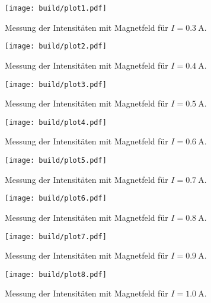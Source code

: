 \begin{figure}
  \centering
  \texttt{[image: build/plot1.pdf]}
  \caption{Messung der Intensitäten mit Magnetfeld für $I=\SI{0.3}{\ampere}$.}
  \label{fig:plot1}
\end{figure}

\begin{figure}
  \centering
  \texttt{[image: build/plot2.pdf]}
  \caption{Messung der Intensitäten mit Magnetfeld für $I=\SI{0.4}{\ampere}$.}
  \label{fig:plot2}
\end{figure}

\begin{figure}
  \centering
  \texttt{[image: build/plot3.pdf]}
  \caption{Messung der Intensitäten mit Magnetfeld für $I=\SI{0.5}{\ampere}$.}
  \label{fig:plot3}
\end{figure}

\begin{figure}
  \centering
  \texttt{[image: build/plot4.pdf]}
  \caption{Messung der Intensitäten mit Magnetfeld für $I=\SI{0.6}{\ampere}$.}
  \label{fig:plot4}
\end{figure}

\begin{figure}
  \centering
  \texttt{[image: build/plot5.pdf]}
  \caption{Messung der Intensitäten mit Magnetfeld für $I=\SI{0.7}{\ampere}$.}
  \label{fig:plot5}
\end{figure}

\begin{figure}
  \centering
  \texttt{[image: build/plot6.pdf]}
  \caption{Messung der Intensitäten mit Magnetfeld für $I=\SI{0.8}{\ampere}$.}
  \label{fig:plot6}
\end{figure}

\begin{figure}
  \centering
  \texttt{[image: build/plot7.pdf]}
  \caption{Messung der Intensitäten mit Magnetfeld für $I=\SI{0.9}{\ampere}$.}
  \label{fig:plot7}
\end{figure}

\begin{figure}
  \centering
  \texttt{[image: build/plot8.pdf]}
  \caption{Messung der Intensitäten mit Magnetfeld für $I=\SI{1.0}{\ampere}$.}
  \label{fig:plot8}
\end{figure}
